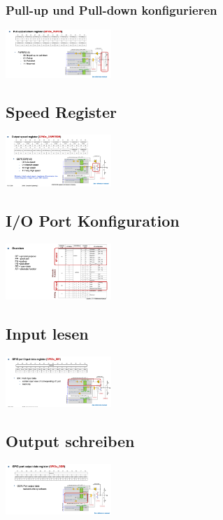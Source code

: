 \subsubsection{Pull-up und Pull-down konfigurieren}
\includegraphics[width=0.3\textwidth]{sections/images/pullup.png}

\subsection{Speed Register}
\includegraphics[width=0.3\textwidth]{sections/images/speed.png}

\subsection{I/O Port Konfiguration}
\includegraphics[width=0.3\textwidth]{sections/images/io_config.png}

\subsection{Input lesen}
\includegraphics[width=0.3\textwidth]{sections/images/reading_gpio.png}

\subsection{Output schreiben}
\includegraphics[width=0.3\textwidth]{sections/images/writing_gpio.png}


